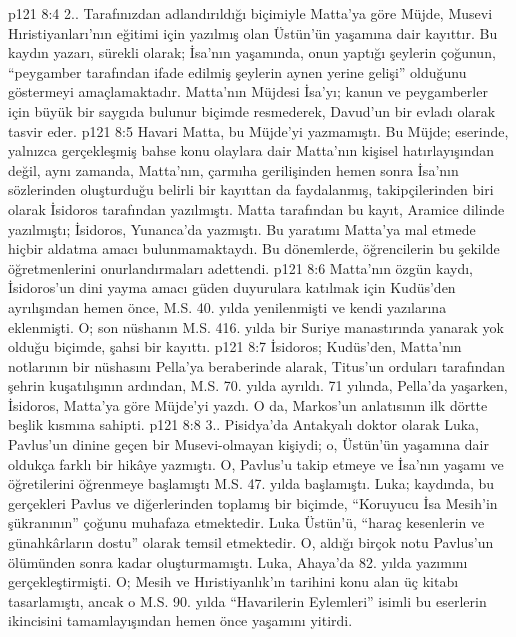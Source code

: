 \vs p121 8:4 2.\bibnobreakspace {}. Tarafınızdan adlandırıldığı biçimiyle Matta’ya göre Müjde, Musevi Hıristiyanları’nın eğitimi için yazılmış olan Üstün’ün yaşamına dair kayıttır. Bu kaydın yazarı, sürekli olarak; İsa’nın yaşamında, onun yaptığı şeylerin çoğunun, “peygamber tarafından ifade edilmiş şeylerin aynen yerine gelişi” olduğunu göstermeyi amaçlamaktadır. Matta’nın Müjdesi İsa’yı; kanun ve peygamberler için büyük bir saygıda bulunur biçimde resmederek, Davud’un bir evladı olarak tasvir eder.
\vs p121 8:5 Havari Matta, bu Müjde’yi yazmamıştı. Bu Müjde; eserinde, yalnızca gerçekleşmiş bahse konu olaylara dair Matta’nın kişisel hatırlayışından değil, aynı zamanda, Matta’nın, çarmıha gerilişinden hemen sonra İsa’nın sözlerinden oluşturduğu belirli bir kayıttan da faydalanmış, takipçilerinden biri olarak İsidoros tarafından yazılmıştı. Matta tarafından bu kayıt, Aramice dilinde yazılmıştı; İsidoros, Yunanca’da yazmıştı. Bu yaratımı Matta’ya mal etmede hiçbir aldatma amacı bulunmamaktaydı. Bu dönemlerde, öğrencilerin bu şekilde öğretmenlerini onurlandırmaları adettendi.
\vs p121 8:6 Matta’nın özgün kaydı, İsidoros’un dini yayma amacı güden duyurulara katılmak için Kudüs’den ayrılışından hemen önce, M.S. 40. yılda yenilenmişti ve kendi yazılarına eklenmişti. O; son nüshanın M.S. 416. yılda bir Suriye manastırında yanarak yok olduğu biçimde, şahsi bir kayıttı.
\vs p121 8:7 İsidoros; Kudüs’den, Matta’nın notlarının bir nüshasını Pella’ya beraberinde alarak, Titus’un orduları tarafından şehrin kuşatılışının ardından, M.S. 70. yılda ayrıldı. 71 yılında, Pella’da yaşarken, İsidoros, Matta’ya göre Müjde’yi yazdı. O da, Markos’un anlatısının ilk dörtte beşlik kısmına sahipti.
\vs p121 8:8 3.\bibnobreakspace {}. Pisidya’da Antakyalı doktor olarak Luka, Pavlus’un dinine geçen bir Musevi\hyp{}olmayan kişiydi; o, Üstün’ün yaşamına dair oldukça farklı bir hikâye yazmıştı. O, Pavlus’u takip etmeye ve İsa’nın yaşamı ve öğretilerini öğrenmeye başlamıştı M.S. 47. yılda başlamıştı. Luka; kaydında, bu gerçekleri Pavlus ve diğerlerinden toplamış bir biçimde, “Koruyucu İsa Mesih’in şükranının” çoğunu muhafaza etmektedir. Luka Üstün’ü, “haraç kesenlerin ve günahkârların dostu” olarak temsil etmektedir. O, aldığı birçok notu Pavlus’un ölümünden sonra kadar oluşturmamıştı. Luka, Ahaya’da 82. yılda yazımını gerçekleştirmişti. O; Mesih ve Hıristiyanlık’ın tarihini konu alan üç kitabı tasarlamıştı, ancak o M.S. 90. yılda “Havarilerin Eylemleri” isimli bu eserlerin ikincisini tamamlayışından hemen önce yaşamını yitirdi.
